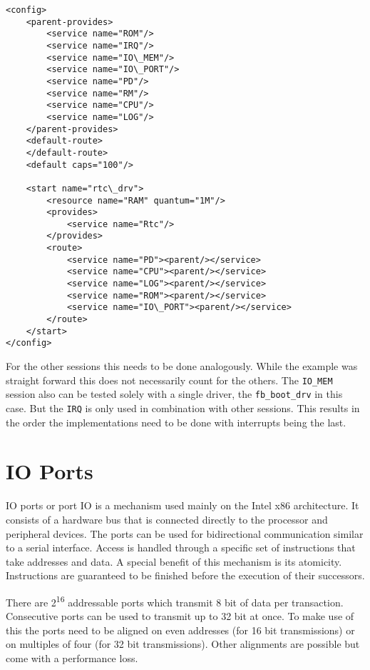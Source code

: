 \documentclass[
a4paper,
12pt,
notitlepage,
parskip=half,
DIV=11,
]{scrbook}
\begin{document}
		\begin{lstlisting}
<config>
	<parent-provides>
		<service name="ROM"/>
		<service name="IRQ"/>
		<service name="IO\_MEM"/>
		<service name="IO\_PORT"/>
		<service name="PD"/>
		<service name="RM"/>
		<service name="CPU"/>
		<service name="LOG"/>
	</parent-provides>
	<default-route>
	</default-route>
	<default caps="100"/>
		
	<start name="rtc\_drv">
		<resource name="RAM" quantum="1M"/>
		<provides>
			<service name="Rtc"/>
		</provides>
		<route>
			<service name="PD"><parent/></service>
			<service name="CPU"><parent/></service>
			<service name="LOG"><parent/></service>
			<service name="ROM"><parent/></service>
			<service name="IO\_PORT"><parent/></service>
		</route>
	</start>
</config>
		\end{lstlisting}
		
		For the other sessions this needs to be done analogously.
		While the example was straight forward this does not necessarily count for the others.
		The \texttt{IO\_MEM} session also can be tested solely with a single driver, the \texttt{fb\_boot\_drv} in this case.
		But the \texttt{IRQ} is only used in combination with other sessions.
		This results in the order the implementations need to be done with interrupts being the last.
		
		\section{IO Ports}
		
		IO ports or port IO is a mechanism used mainly on the Intel x86 architecture.
		It consists of a hardware bus that is connected directly to the processor and peripheral devices.
		The ports can be used for bidirectional communication similar to a serial interface.
		Access is handled through a specific set of instructions that take addresses and data.
		A special benefit of this mechanism is its atomicity.
		Instructions are guaranteed to be finished before the execution of their successors.
		
		There are 2\textsuperscript{16} addressable ports which transmit 8 bit of data per transaction.
		Consecutive ports can be used to transmit up to 32 bit at once.
		To make use of this the ports need to be aligned on even addresses (for 16 bit transmissions) or on multiples of four (for 32 bit transmissions).
		Other alignments are possible but come with a performance loss.
		
\end{document}
